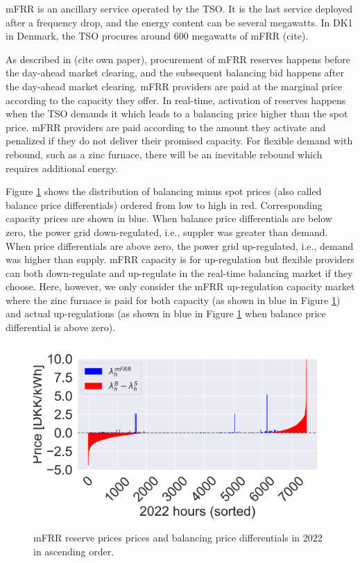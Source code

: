 \documentclass[lettersize,journal]{IEEEtran}
\begin{document}
mFRR is an ancillary service operated by the TSO. It is the last service deployed after a frequency drop, and the energy content can be several megawatts. In DK1 in Denmark, the TSO procures around 600 megawatts of mFRR (cite).

As described in (cite own paper), procurement of mFRR reserves happens before the day-ahead market clearing, and the subsequent balancing bid happens after the day-ahead market clearing. mFRR providers are paid at the marginal price according to the capacity they offer. In real-time, activation of reserves happens when the TSO demands it which leads to a balancing price higher than the spot price. mFRR providers are paid according to the amount they activate and penalized if they do not deliver their promised capacity. For flexible demand with rebound, such as a zinc furnace, there will be an inevitable rebound which requires additional energy.

Figure \ref{fig:mfrr_prices_2022} shows the distribution of balancing minus spot prices (also called balance price differentials) ordered from low to high in red. Corresponding capacity prices are shown in blue. When balance price differentials are below zero, the power grid down-regulated, i.e., suppler was greater than demand. When price differentials are above zero, the power grid up-regulated, i.e., demand was higher than supply. mFRR capacity is for up-regulation but flexible providers can both down-regulate and up-regulate in the real-time balancing market if they choose. Here, however, we only consider the mFRR up-regulation capacity market where the zinc furnace is paid for both capacity (as shown in blue in Figure \ref{fig:mfrr_prices_2022}) and actual up-regulations (as shown in blue in Figure \ref{fig:mfrr_prices_2022} when balance price differential is above zero).

\begin{figure}[!t]
    \centering
    \includegraphics[width=\columnwidth]{figures/mfrr_prices.png}
    \caption{mFRR reserve prices prices and balancing price differentials in 2022 in ascending order.}
    \label{fig:mfrr_prices_2022}
\end{figure}
\end{document}
